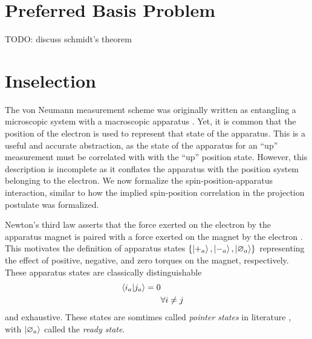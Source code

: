 \section{Preferred Basis Problem}
TODO: discuss schmidt's theorem

\section{Inselection}

The von Neumann measurement scheme was originally written as entangling a microscopic system with a macroscopic apparatus \cite{von Neumann}. Yet, it is common that the position of the electron is used to represent that state of the apparatus. This is a useful and accurate abstraction, as the state of the apparatus for an ``up'' measurement must be correlated with with the ``up'' position state. However, this description is incomplete as it conflates the apparatus with the position system belonging to the electron. We now formalize the spin-position-apparatus interaction, similar to how the implied spin-position correlation in the projection postulate was formalized.

Newton's third law asserts that the force exerted on the electron by the apparatus magnet is paired with a force exerted on the magnet by the electron \cite{Newton}. This motivates the definition of apparatus states $\{\ket{+_a}, \ket{-_a}, \ket{\varnothing_a}\}$ representing the effect of positive, negative, and zero torques on the magnet, respectively. These apparatus states are classically distinguishable
\begin{align}
    \braket{i_a|j_a} = 0 \\
    &\forall i \neq j
\end{align}
and exhaustive. These states are somtimes called \textit{pointer states} in literature \cite{Zeh}, with $\ket{\varnothing_a}$ called the \textit{ready state}.

